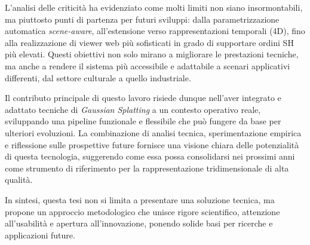 L'analisi delle criticità ha evidenziato come molti limiti non siano insormontabili, ma piuttosto punti di partenza per futuri sviluppi: dalla parametrizzazione automatica \emph{scene-aware}, all'estensione verso rappresentazioni temporali (4D), fino alla realizzazione di viewer web più sofisticati in grado di supportare ordini SH più elevati.  
Questi obiettivi non solo mirano a migliorare le prestazioni tecniche, ma anche a rendere il sistema più accessibile e adattabile a scenari applicativi differenti, dal settore culturale a quello industriale.

Il contributo principale di questo lavoro risiede dunque nell'aver integrato e adattato tecniche di \emph{Gaussian Splatting} a un contesto operativo reale, sviluppando una pipeline funzionale e flessibile che può fungere da base per ulteriori evoluzioni.  
La combinazione di analisi tecnica, sperimentazione empirica e riflessione sulle prospettive future fornisce una visione chiara delle potenzialità di questa tecnologia, suggerendo come essa possa consolidarsi nei prossimi anni come strumento di riferimento per la rappresentazione tridimensionale di alta qualità.

In sintesi, questa tesi non si limita a presentare una soluzione tecnica, ma propone un approccio metodologico che unisce rigore scientifico, attenzione all'usabilità e apertura all'innovazione, ponendo solide basi per ricerche e applicazioni future.


